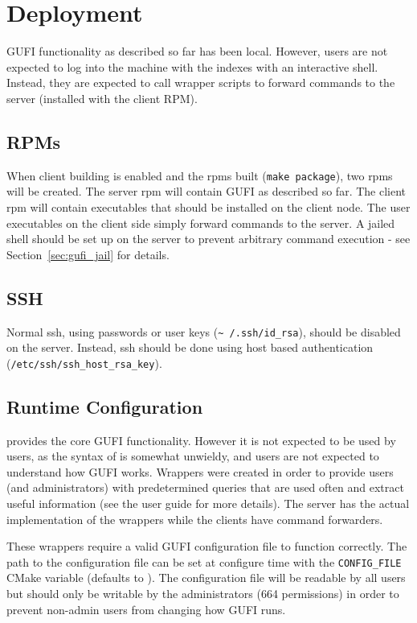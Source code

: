 \section{Deployment}
\label{sec:deploy}
GUFI functionality as described so far has been local. However, users
are not expected to log into the machine with the indexes with an
interactive shell. Instead, they are expected to call wrapper scripts
to forward commands to the server (installed with the client RPM).

\subsection{RPMs}
When client building is enabled and the rpms built (\texttt{make
  package}), two rpms will be created. The server rpm will contain
GUFI as described so far. The client rpm will contain executables that
should be installed on the client node. The user executables on the
client side simply forward commands to the server. A jailed shell
should be set up on the server to prevent arbitrary command execution
- see Section~\ref{sec:gufi_jail} for details.

\subsection{SSH}
Normal ssh, using passwords or user keys (\texttt{\textasciitilde
  /.ssh/id\_rsa}), should be disabled on the server. Instead, ssh
should be done using host based authentication
(\texttt{/etc/ssh/ssh\_host\_rsa\_key}).

\subsection{Runtime Configuration}
\gufiquery provides the core GUFI functionality. However it is not
expected to be used by users, as the syntax of \gufiquery is somewhat
unwieldy, and users are not expected to understand how GUFI
works. Wrappers were created in order to provide users (and
administrators) with predetermined queries that are used often and
extract useful information (see the user guide for more details). The
server has the actual implementation of the wrappers while the clients
have command forwarders.

These wrappers require a valid GUFI configuration file to function
correctly. The path to the configuration file can be set at configure
time with the \texttt{CONFIG\_FILE} CMake variable (defaults to
\guficonfigfile). The configuration file will be readable by all users
but should only be writable by the administrators (664 permissions) in
order to prevent non-admin users from changing how GUFI runs.

